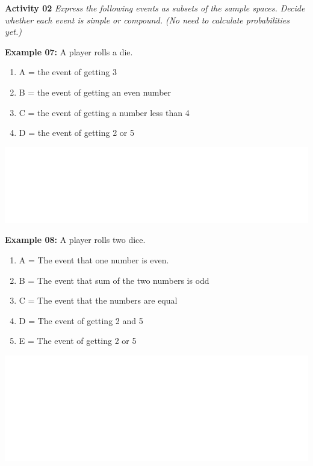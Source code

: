 \documentclass[]{book}
\providecommand{\tightlist}{%
  \setlength{\itemsep}{0pt}\setlength{\parskip}{0pt}}
\begin{document}
\textbf{Activity 02}
\emph{Express the following events as subsets of the sample spaces. Decide whether each event is simple or compound. (No need to calculate probabilities yet.)}

\textbf{Example 07:} A player rolls a die.

\begin{enumerate}
\def\labelenumi{\alph{enumi})}
\tightlist
\item
  A = the event of getting 3
\item
  B = the event of getting an even number
\item
  C = the event of getting a number less than 4
\item
  D = the event of getting 2 or 5
\end{enumerate}

\begin{center}\includegraphics[width=1\linewidth]{figure/box72a-1} \end{center}

\textbf{Example 08:} A player rolls two dice.

\begin{enumerate}
\def\labelenumi{\alph{enumi})}
\tightlist
\item
  A = The event that one number is even.
\item
  B = The event that sum of the two numbers is odd
\item
  C = The event that the numbers are equal
\item
  D = The event of getting 2 and 5
\item
  E = The event of getting 2 or 5
\end{enumerate}

\begin{center}\includegraphics[width=1\linewidth]{figure/box72b-1} \end{center}
\end{document}
